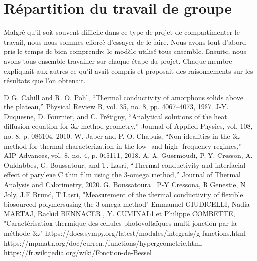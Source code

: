 \documentclass[10pt,a4paper]{report}
\begin{document}
\section{Répartition du travail de groupe}
Malgré qu'il soit souvent difficile dans ce type de projet de compartimenter le travail, nous nous sommes efforcé d'essayer de le faire. Nous avons tout d'abord pris le temps de bien comprendre le modèle utilisé tous ensemble. Ensuite, nous avons tous ensemble travailler sur chaque étape du projet. Chaque membre expliquait aux autres ce qu'il avait compris et proposait des raisonnements sur les résultats que l'on obtenait.
\begin{thebibliography}
D G. Cahill and R. O. Pohl, “Thermal conductivity of amorphous solids above the plateau,” Physical Review B,
vol. 35, no. 8, pp. 4067–4073, 1987.
\newline
\newline
J-Y. Duquesne, D. Fournier, and C. Frétigny, “Analytical solutions of the heat diffusion equation for 3$\omega$ method
geometry,” Journal of Applied Physics, vol. 108, no. 8, p. 086104, 2010.
\newline
\newline
 W. Jaber and P.-O. Chapuis, “Non-idealities in the 3$\omega$ method for thermal characterization in the low- and high-
frequency regimes,” AIP Advances, vol. 8, no. 4, p. 045111, 2018.
\newline
\newline
A. A. Guermoudi, P. Y. Cresson, A. Ouldabbes, G. Boussatour, and T. Lasri, “Thermal conductivity and
interfacial effect of parylene C thin film using the 3-omega method,” Journal of Thermal Analysis and
Calorimetry, 2020.
\newline
\newline
G. Boussatoura , P-Y Cressona, B Genestie, N Joly, J.F Brund, T Lasri, "Measurement of the thermal conductivity of flexible biosourced polymersusing the 3-omega method"
\newline
\newline
Emmanuel GIUDICELLI, Nadia MARTAJ, Rachid BENNACER , Y. CUMINAL1 et Philippe COMBETTE, "Caractérisation thermique des cellules photovoltaïques multi-jonction par la méthode 3$\omega$"
\newline
\newline
https://docs.sympy.org/latest/modules/integrals/g-functions.html
\newline
\newline
https://mpmath.org/doc/current/functions/hypergeometric.html
\newline
\newline
https://fr.wikipedia.org/wiki/Fonction-de-Bessel
\end{thebibliography}
\end{document}
